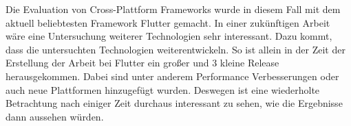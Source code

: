 Die Evaluation von Cross-Plattform Frameworks wurde in diesem Fall mit dem aktuell beliebtesten Framework Flutter gemacht. In einer zukünftigen Arbeit wäre eine Untersuchung weiterer Technologien sehr interessant. Dazu kommt, dass die untersuchten Technologien weiterentwickeln. So ist allein in der Zeit der Erstellung der Arbeit bei Flutter ein großer und 3 kleine Release herausgekommen. Dabei sind unter anderem Performance Verbesserungen oder auch neue Plattformen hinzugefügt wurden. Deswegen ist eine wiederholte Betrachtung nach einiger Zeit durchaus interessant zu sehen, wie die Ergebnisse dann aussehen würden.
